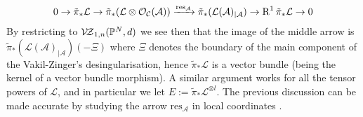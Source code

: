 \[0\rightarrow \tilde\pi_*\mathcal L\rightarrow \tilde\pi_*(\mathcal L\otimes \mathcal{O}_{\mathcal C}(\mathcal A))\xrightarrow{\mathrm{res}_{\mathcal A}} \tilde\pi_*(\mathcal L(\mathcal A)_{|\mathcal A})\rightarrow \operatorname{R}^1\tilde\pi_*\mathcal L\rightarrow 0\]
By restricting to $\mathcal{V\!Z}_{1,n}(\mathbb P^N,d)$ we see then that the image of the middle arrow is $\tilde\pi_*(\mathcal L(\mathcal A)_{|\mathcal A})(-\Xi)$ where $\Xi$ denotes the boundary of the main component of the Vakil-Zinger's desingularisation, hence $\tilde\pi_*\mathcal L$ is a vector bundle (being the kernel of a vector bundle morphism). A similar argument works for all the tensor powers of $\mathcal L$, and in particular we let $E:=\tilde\pi_*\mathcal L^{\otimes l}$. The previous discussion can be made accurate by studying the arrow $\mathrm{res}_{\mathcal A}$ in local coordinates \cite[Proposition 4.13]{HL}.

